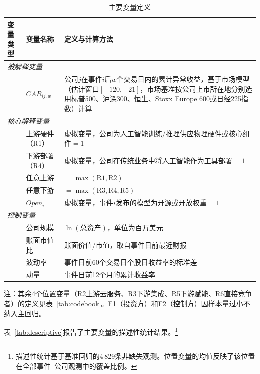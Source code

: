 \documentclass[11pt,fontset=fandol,a4paper]{ctexart}
\newcommand{\revise}[1]{#1}
\begin{document}
\begin{table}[H]
\centering
\small
\begin{threeparttable}
\caption{主要变量定义}
\label{tab:vardef}
\begin{tabular}{llp{7.5cm}}
\toprule
变量类型 & 变量名称 & 定义与计算方法 \\
\midrule
\multicolumn{3}{l}{\textit{被解释变量}} \\
 & $CAR_{ij,w}$ & 公司$j$在事件$i$后$w$个交易日内的累计异常收益，基于市场模型（估计窗口$[-120,-21]$，\revise{市场基准按公司上市所在地分别选用标普500、沪深300、恒生、Stoxx Europe 600或日经225指数}）计算 \\[3pt]
\multicolumn{3}{l}{\textit{核心解释变量}} \\
 & 上游硬件（R1） & 虚拟变量，公司为人工智能训练/推理供应物理硬件或核心组件$=1$ \\
 & 下游部署（R4） & 虚拟变量，公司在传统业务中将人工智能作为工具部署$=1$ \\
 & 任意上游 & $=\max(\text{R1},\text{R2})$ \\
 & 任意下游 & $=\max(\text{R3},\text{R4},\text{R5})$ \\
 & $Open_i$ & 虚拟变量，事件$i$发布的模型为开源或开放权重$=1$ \\[3pt]
\multicolumn{3}{l}{\textit{控制变量}} \\
 & 公司规模 & $\ln(\text{总资产})$，单位为百万美元 \\
 & 账面市值比 & 账面价值/市值，取自事件日前最近财报 \\
 & 波动率 & 事件日前60个交易日个股日收益率的标准差 \\
 & 动量 & 事件日前12个月的累计收益率 \\
\bottomrule
\end{tabular}
\begin{tablenotes}
\footnotesize
\item 注：其余4个位置变量（R2上游云服务、R3下游集成、R5下游赋能、R6直接竞争者）的定义见表~\ref{tab:codebook}。F1（投资方）和F2（控制方）因样本量过小不纳入主回归。
\end{tablenotes}
\end{threeparttable}
\end{table}

表~\ref{tab:descriptive}报告了主要变量的描述性统计结果。\footnote{描述性统计基于基准回归的4\,829条非缺失观测。位置变量的均值反映了该位置在全部事件--公司观测中的覆盖比例。}
\end{document}
